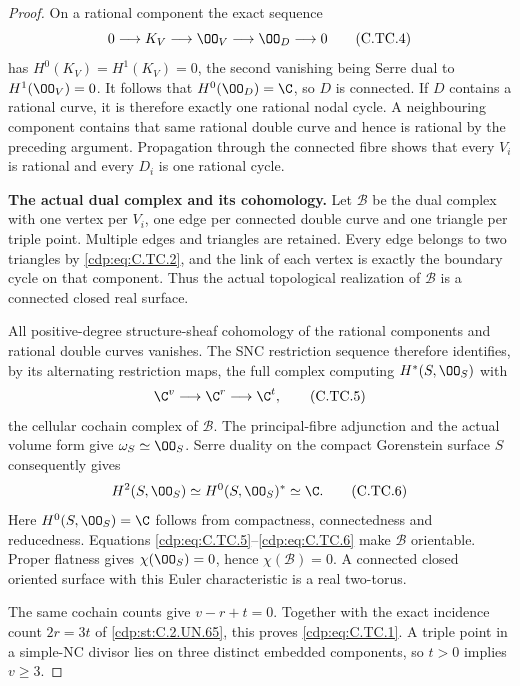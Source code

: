 \begin{proof}
On a rational component the exact sequence
\[
 0\longrightarrow K_V\longrightarrow\OO_V
                 \longrightarrow\OO_D\longrightarrow0
\tag{C.TC.4}\label{cdp:eq:C.TC.4}
\]
has $H^0(K_V)=H^1(K_V)=0$, the second vanishing
being Serre dual to $H^1(\OO_V)=0$.
It follows that $H^0(\OO_D)=\C$, so $D$ is
connected. If $D$ contains a rational curve,
it is therefore exactly one rational nodal
cycle. A neighbouring component contains
that same rational double curve and hence
is rational by the preceding argument.
Propagation through the connected fibre
shows that every $V_i$ is rational and
every $D_i$ is one rational cycle.

\par\medskip\noindent\textbf{The actual dual complex and its cohomology.}
Let $\mathcal B$ be the dual complex with
one vertex per $V_i$, one edge per connected
double curve and one triangle per triple
point. Multiple edges and triangles are
retained. Every edge belongs to two
triangles by \eqref{cdp:eq:C.TC.2}, and the link of
each vertex is exactly the boundary cycle
on that component. Thus the actual
topological realization of $\mathcal B$
is a connected closed real surface.

All positive-degree structure-sheaf
cohomology of the rational components
and rational double curves vanishes.
The SNC restriction sequence therefore
identifies, by its alternating restriction
maps, the full complex computing
$H^*(S,\OO_S)$ with
\[
           \C^{v}\longrightarrow\C^{r}
                                  \longrightarrow\C^{t},
\tag{C.TC.5}\label{cdp:eq:C.TC.5}
\]
the cellular cochain complex of
$\mathcal B$. The principal-fibre
adjunction and the actual volume form
give $\omega_S\simeq\OO_S$.
Serre duality on the compact Gorenstein
surface $S$ consequently gives
\[
             H^2(S,\OO_S)\simeq
                         H^0(S,\OO_S)^*\simeq\C.
\tag{C.TC.6}\label{cdp:eq:C.TC.6}
\]
Here $H^0(S,\OO_S)=\C$ follows from
compactness, connectedness and reducedness.
Equations \eqref{cdp:eq:C.TC.5}--\eqref{cdp:eq:C.TC.6} make
$\mathcal B$ orientable. Proper flatness
gives $\chi(\OO_S)=0$, hence
$\chi(\mathcal B)=0$. A connected closed
oriented surface with this Euler
characteristic is a real two-torus.

The same cochain counts give
$v-r+t=0$. Together with the exact
incidence count $2r=3t$ of \ref{cdp:st:C.2.UN.65},
this proves \eqref{cdp:eq:C.TC.1}. A triple point
in a simple-NC divisor lies on three
distinct embedded components, so
$t>0$ implies $v\ge3$.


\end{proof}
